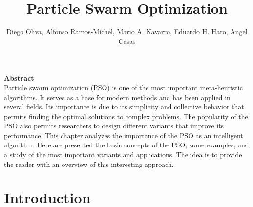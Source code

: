 \title{Particle Swarm Optimization}
\label{chp:particle-swarm-optimization}
\author{Diego Oliva, Alfonso Ramos-Michel, Mario A. Navarro, Eduardo H. Haro, Angel Casas}
\maketitle


\textbf{Abstract}\\
Particle swarm optimization (PSO) is one of the most important meta-heuristic algorithms. It serves as a base for modern methods and has been applied in several fields. Its importance is due to its simplicity and collective behavior that permits finding the optimal solutions to complex problems. The popularity of the PSO also permits researchers to design different variants that improve its performance. This chapter analyzes the importance of the PSO as an intelligent algorithm. Here are presented the basic concepts of the PSO, some examples, and a study of the most important variants and applications. The idea is to provide the reader with an overview of this interesting approach.






\section{Introduction}
\label{sec:intro}

